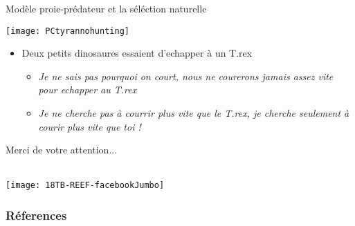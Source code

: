 \documentclass[10pt]{beamer}
\begin{document}
\begin{frame}{Modèle proie-prédateur et la séléction naturelle}
  \begin{center}
    \texttt{[image: PCtyrannohunting]}
  \end{center}
  \begin{itemize}[<+->]
  \item Deux petits dinosaures essaient d'echapper à un T.rex
    \begin{itemize}
    \item \textit{Je ne sais pas pourquoi on court, nous ne courerons jamais assez
        vite pour echapper au T.rex}
    \item \textit{Je ne cherche pas à courrir plus vite que le T.rex, je cherche
        seulement à courir plus vite que toi !} 
    \end{itemize}
  \end{itemize}
\end{frame}


\begin{frame}[plain]
  \begin{center}
    \begin{huge}
      Merci de votre attention...\\~\\
    \end{huge}
    \texttt{[image: 18TB-REEF-facebookJumbo]}
  \end{center}
\end{frame}

\begin{frame}[allowframebreaks]
  \begin{tiny}
    \frametitle{Réferences}
    
    
  \end{tiny}
\end{frame}
\end{document}
